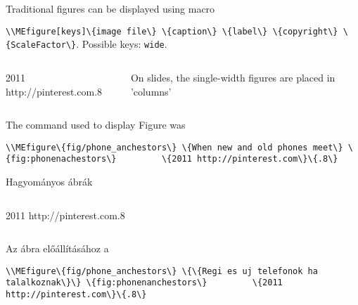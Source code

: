 



{
Traditional figures can be displayed using macro
\par\noindent\lstinline|\\MEfigure[keys]\{image file\} \{caption\} \{label\} \{copyright\} \{ScaleFactor\}|.
Possible keys: \lstinline|wide|.


\begin{columns}
		{2011 http://pinterest.com}{.8}

On slides, the single-width figures are placed in 'columns'
\end{columns}

\par\noindent The command used to display Figure\ao{~\ref{fig:phonenanchestors}} was
\par\noindent\lstinline|\\MEfigure\{fig/phone_anchestors\} \{When new and old phones meet\} \{fig:phonenachestors\}
		\{2011 http://pinterest.com\}\{.8\}|

}
{Hagyományos ábrák}
{
\begin{columns}
		{2011 http://pinterest.com}{.8}
\end{columns}
\par\noindent Az \ao{~\ref{fig:phonenanchestors}} ábra előállításához a
\par\noindent\lstinline|\\MEfigure\{fig/phone_anchestors\} \{\{Regi es uj telefonok ha talalkoznak\}\} \{fig:phonenanchestors\}
		\{2011 http://pinterest.com\}\{.8\}|
}

